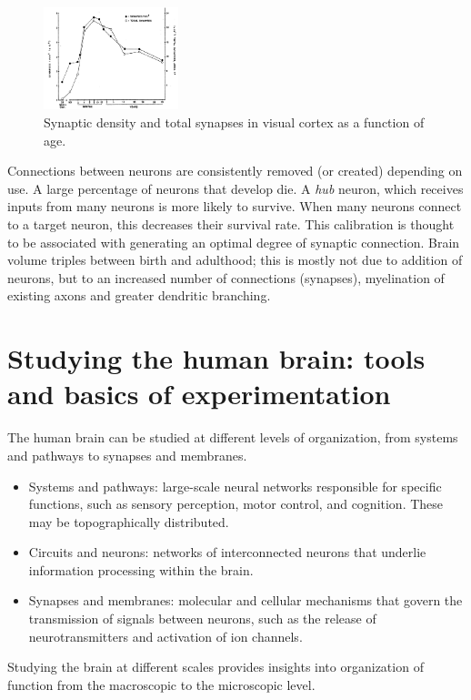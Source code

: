 \begin{figure}
  \centering
  \includegraphics[width=0.35\textwidth]{images/neuroplasticity.png}
  \caption*{Synaptic density and total synapses in visual cortex as a function of age.}
\end{figure}
Connections between neurons are consistently removed (or created) depending on use.
A large percentage of neurons that develop die. A \textit{hub} neuron, which receives inputs from many neurons is more likely to survive. When many neurons connect to a target neuron, this decreases their survival rate. This calibration is thought to be associated with generating an optimal degree of 
synaptic connection.
Brain volume triples between birth and adulthood; this is mostly not due to addition of neurons, but to an increased number of connections (synapses), myelination of existing axons and greater dendritic branching.

\section{Studying the human brain: tools and basics of experimentation}
The human brain can be studied at different levels of organization, from systems and pathways to synapses and membranes.
\begin{itemize}
    \item Systems and pathways: large-scale neural networks responsible for specific functions, such as sensory perception, motor control, and cognition. These may be topographically distributed.
    \item Circuits and neurons: networks of interconnected neurons that underlie information processing within the brain.
    \item Synapses and membranes: molecular and cellular mechanisms that govern the transmission of signals between neurons, such as the release of neurotransmitters and activation of ion channels.
\end{itemize}
Studying the brain at different scales provides insights into organization of function from the macroscopic to the microscopic level.

